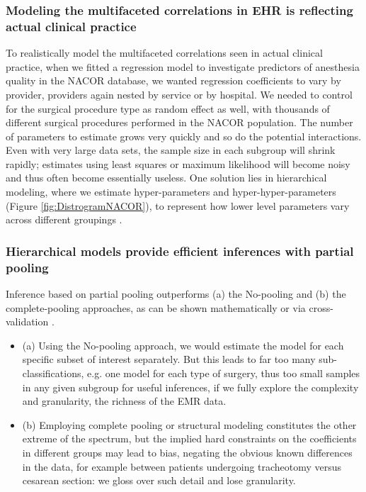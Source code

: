 \documentclass[11pt,notitlepage]{article}
\begin{document}
\subsubsection*{Modeling the multifaceted correlations in EHR is reflecting actual clinical practice}
To realistically model the multifaceted correlations seen in actual clinical practice, when we fitted a regression model to investigate predictors of anesthesia quality in the NACOR database, we wanted regression coefficients to vary by provider, providers again nested by service or by hospital\cite{AndreaeWhite2015}. We needed to control for the surgical procedure type as random effect as well, with thousands of different surgical procedures performed in the NACOR population. The number of parameters to estimate grows very quickly and so do the potential interactions. Even with very large data sets, the sample size in each subgroup will shrink rapidly; estimates using least squares or maximum likelihood will become noisy and thus often become essentially useless. One solution lies in hierarchical modeling, where we estimate hyper-parameters and hyper-hyper-parameters (Figure \ref{fig:DistrogramNACOR}), to represent how lower level parameters vary across different groupings \cite{Bafumi2007}.

\subsubsection*{Hierarchical models provide efficient inferences with partial pooling}
Inference based on partial pooling outperforms (a) the No-pooling and (b) the complete-pooling approaches, as can be shown mathematically \cite{Efron_1975} or via cross-validation \cite{Gelman2014}.  

\begin{itemize}

\item (a) Using the No-pooling approach, we would estimate the model for each specific subset of interest separately. But this leads to far too many sub-classifications, e.g. one model for each type of surgery, thus too small samples in any given subgroup for useful inferences, if we fully explore the complexity and granularity, the richness of the EMR data. 
\item (b) Employing complete pooling or structural modeling constitutes the other extreme of the spectrum, but the implied hard constraints on the coefficients in different groups may lead to bias, negating the obvious known differences in the data, for example between patients undergoing tracheotomy versus cesarean section: we gloss over such detail and lose granularity. 
\end{itemize}
\end{document}
